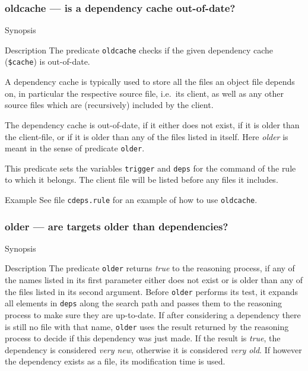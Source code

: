 \documentclass[11pt]{scrartcl}
\begin{document}
\subsubsection{oldcache --- is a dependency cache out-of-date?}
\begin{Describe}
\item[Synopsis]  
\item[Description] The predicate \texttt{oldcache} checks if the given
  dependency cache (\texttt{\$cache}) is out-of-date. 
  
  A dependency cache is typically used to store all the files an
  object file depends on, in particular the respective source file,
  i.e.\ its client, as well as any other source files which are
  (recursively) included by the client.
  
  The dependency cache is out-of-date, if it either does not exist, if
  it is older than the client-file, or if it is older than any of the
  files listed in itself. Here \textit{older} is meant in the sense of 
  predicate \texttt{older}. 

  This predicate sets the variables \texttt{trigger} and
  \texttt{deps} for the command of the rule to which it belongs. The
  client file will be listed before any files it includes.
\item[Example] See file \texttt{cdeps.rule} for an example of how to use 
  \texttt{oldcache}.
\end{Describe}
\subsubsection{older --- are targets older than dependencies?}
\label{pred:older}
\begin{Describe}
\item[Synopsis]  
\item[Description] The predicate \texttt{older} returns \textit{true}
  to the reasoning process, if any of the names listed in its first
  parameter either does not exist or is older than any of the files
  listed in its second argument. Before \texttt{older} performs its
  test, it expands all elements in \texttt{deps} along the search path
  and passes them to the reasoning process to make sure they are
  up-to-date. If after considering a dependency there is still no file
  with that name, \texttt{older} uses the result returned by the
  reasoning process to decide if this dependency was just made. If the
  result is \textit{true}, the dependency is considered \textit{very
    new}, otherwise it is considered \textit{very old}. If however the
  dependency exists as a file, its modification time is used.
\end{Describe}
\end{document}
